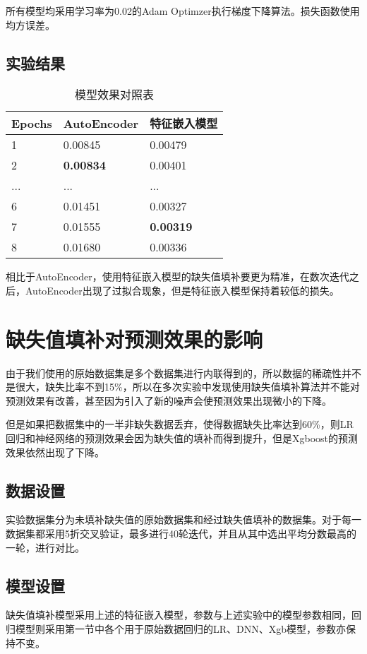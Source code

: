 所有模型均采用学习率为0.02的Adam Optimzer执行梯度下降算法。损失函数使用均方误差。
\subsection{实验结果}
\begin{table}[htb]
    \caption{模型效果对照表}
    \centering
    \begin{tabular}{lll}
    \toprule
    Epochs & AutoEncoder & 特征嵌入模型 \\
    \midrule
    1 & 0.00845 & 0.00479 \\
    2 & \textbf{0.00834} & 0.00401 \\
    ... & ... & ... \\
    6 & 0.01451 & 0.00327 \\
    7 & 0.01555 & \textbf{0.00319} \\
    8 & 0.01680 & 0.00336 \\
    \bottomrule
    \end{tabular}
\end{table}
相比于AutoEncoder，使用特征嵌入模型的缺失值填补要更为精准，在数次迭代之后，AutoEncoder出现了过拟合现象，但是特征嵌入模型保持着较低的损失。

\section{缺失值填补对预测效果的影响}
由于我们使用的原始数据集是多个数据集进行内联得到的，所以数据的稀疏性并不是很大，缺失比率不到15\%，所以在多次实验中发现使用缺失值填补算法并不能对预测效果有改善，甚至因为引入了新的噪声会使预测效果出现微小的下降。

但是如果把数据集中的一半非缺失数据丢弃，使得数据缺失比率达到60\%，则LR回归和神经网络的预测效果会因为缺失值的填补而得到提升，但是Xgboost的预测效果依然出现了下降。
\subsection{数据设置}
实验数据集分为未填补缺失值的原始数据集和经过缺失值填补的数据集。对于每一数据集都采用5折交叉验证，最多进行40轮迭代，并且从其中选出平均分数最高的一轮，进行对比。
\subsection{模型设置}
缺失值填补模型采用上述的特征嵌入模型，参数与上述实验中的模型参数相同，回归模型则采用第一节中各个用于原始数据回归的LR、DNN、Xgb模型，参数亦保持不变。
